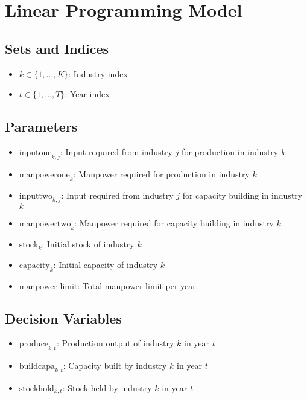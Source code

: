 \documentclass{article}
\begin{document}
\section*{Linear Programming Model}

\subsection*{Sets and Indices}
\begin{itemize}
    \item $k \in \{1, \ldots, K\}$: Industry index
    \item $t \in \{1, \ldots, T\}$: Year index
\end{itemize}

\subsection*{Parameters}
\begin{itemize}
    \item $\text{inputone}_{k, j}$: Input required from industry $j$ for production in industry $k$
    \item $\text{manpowerone}_{k}$: Manpower required for production in industry $k$
    \item $\text{inputtwo}_{k, j}$: Input required from industry $j$ for capacity building in industry $k$
    \item $\text{manpowertwo}_{k}$: Manpower required for capacity building in industry $k$
    \item $\text{stock}_{k}$: Initial stock of industry $k$
    \item $\text{capacity}_{k}$: Initial capacity of industry $k$
    \item $\text{manpower\_limit}$: Total manpower limit per year
\end{itemize}

\subsection*{Decision Variables}
\begin{itemize}
    \item $\text{produce}_{k, t}$: Production output of industry $k$ in year $t$
    \item $\text{buildcapa}_{k, t}$: Capacity built by industry $k$ in year $t$
    \item $\text{stockhold}_{k, t}$: Stock held by industry $k$ in year $t$
\end{itemize}
\end{document}
